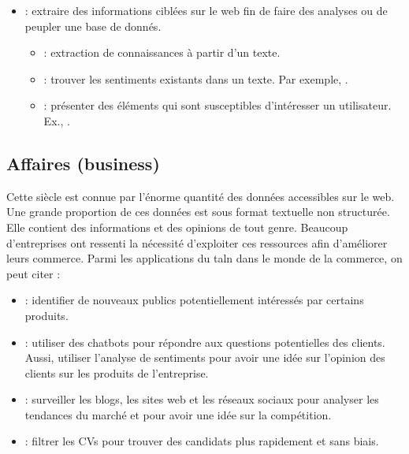 \documentclass{KodeBook}
\begin{document}
\begin{itemize}
	\item {} : extraire des informations ciblées sur le web fin de faire des analyses ou de peupler une base de donnés.
	\begin{itemize}
		\item {} : extraction de connaissances à partir d'un texte.
		\item {} : trouver les sentiments existants dans un texte. Par exemple, .
		\item {} : présenter des éléments qui sont susceptibles d'intéresser un utilisateur. Ex., .
	\end{itemize}
\end{itemize}


\subsection{Affaires (business)}

Cette siècle est connue par l'énorme quantité des données accessibles sur le web. 
Une grande proportion de ces données est sous format textuelle non structurée.
Elle contient des informations et des opinions de tout genre. 
Beaucoup d'entreprises ont ressenti la nécessité d'exploiter ces ressources afin d'améliorer leurs commerce. 
Parmi les applications du \ac{taln} dans le monde de la commerce, on peut citer :
\begin{itemize}
	\item {} : identifier de nouveaux publics potentiellement intéressés par certains produits.
	\item {} : utiliser des chatbots pour répondre aux questions potentielles des clients. Aussi, utiliser l'analyse de sentiments pour avoir une idée sur l'opinion des clients sur les produits de l'entreprise.
	\item {} : surveiller les blogs, les sites web et les réseaux sociaux pour analyser les tendances du marché et pour avoir une idée sur la compétition.
	\item {} : filtrer les CVs pour trouver des candidats plus rapidement et sans biais.
\end{itemize}
\end{document}
